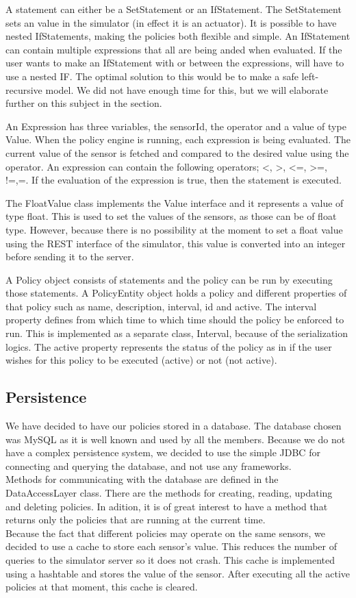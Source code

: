 A statement can either be a SetStatement or an IfStatement. The SetStatement sets an value in the simulator (in effect it is an actuator). It is possible to have nested IfStatements, making the policies both flexible and simple. An IfStatement can contain multiple expressions that all are being anded when evaluated. If the user wants to make an IfStatement with or between the expressions, will have to use a nested IF. The optimal solution to this would be to make a safe left-recursive model. We did not have enough time for this, but we will elaborate further on this subject in the  section. 

An Expression has three variables, the sensorId, the operator and a value of type Value. When the policy engine is running, each expression is being evaluated. The current value of the sensor is fetched and compared to the desired value using the operator. An expression can contain the following operators; <, >, <=, >=, !=,=. 
If the evaluation of the expression is true, then the statement is executed.

The FloatValue class implements the Value interface and it represents a value of type float. This is used to set the values of the sensors, as those can be of float type. However, because there is no possibility at the moment to set a float value using the REST interface of the simulator, this value is converted into an integer before sending it to the server.

A Policy object consists of statements and the policy can be run by executing those statements. A PolicyEntity object holds a policy and different properties of that policy such as name, description, interval, id and active. The interval property defines from which time to which time should the policy be enforced to run. This is implemented as a separate class, Interval, because of the serialization logics.  The active property represents the status of the policy as in if the user wishes for this policy to be executed (active) or not (not active).
\subsection{Persistence}
We have decided to have our policies stored in a database. The database chosen was MySQL as it is well known and used by all the members. Because we do not have a complex persistence system, we decided to use the simple JDBC for connecting and querying the database, and not use any frameworks. 
\\Methods for communicating with the database are defined in the DataAccessLayer class. There are the methods for creating, reading, updating and deleting policies. In adition, it is of great interest to have a method that returns only the policies that are running at the current time. 
\\Because the fact that different policies may operate on the same sensors, we decided to use a cache to store each sensor's value. This reduces the number of queries to the simulator server so it does not crash. This cache is implemented using a hashtable and stores the value of the sensor. After executing all the active policies at that moment, this cache is cleared. 
